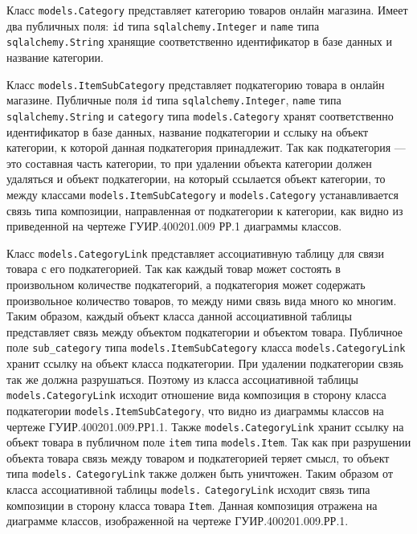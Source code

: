 Класс \texttt{models.Category} представляет категорию товаров онлайн магазина. Имеет два публичных поля: \texttt{id} типа \texttt{sqlalchemy.Integer} и \texttt{name} типа \texttt{sqlalchemy.String} хранящие соответственно идентификатор в базе данных и название категории.

Класс \texttt{models.ItemSubCategory} представляет подкатегорию товара в онлайн магазине. Публичные поля \texttt{id} типа \texttt{sqlalchemy.Integer}, \texttt{name} типа \texttt{sqlalchemy.String} и \texttt{category} типа \texttt{models.Category} хранят соответственно идентификатор в базе данных, название подкатегории и сслыку на объект категории, к которой данная подкатегория принадлежит. Так как подкатегория --- это составная часть категории, то при удалении объекта категории должен удаляться и объект подкатегории, на который ссылается объект категории, то между классами \texttt{models.ItemSubCategory} и \texttt{models.Category} устанавливается связь типа композиции, направленная от подкатегории к категории, как видно из приведенной на чертеже ГУИР.400201.009 РР.1 диаграммы классов.

Класс \texttt{models.CategoryLink} представляет ассоциативную таблицу для связи товара с его подкатегорией. Так как каждый товар может состоять в произвольном количестве подкатегорий, а подкатегория может содержать произвольное количество товаров, то между ними связь вида много ко многим. Таким образом, каждый объект класса данной ассоциативной таблицы представляет связь между объектом подкатегории и объектом товара. Публичное поле \texttt{sub\_category} типа \texttt{models.ItemSubCatego\-ry} класса \texttt{mo\-dels.CategoryLink} хранит ссылку на объект класса подкатегории. При удалении подкатегории свзяь так же должна разрушаться. Поэтому из класса ассоциативной таблицы \texttt{models.CategoryLink} исходит отношение вида композиция в сторону класса подкатегории \texttt{models.Item\-Sub\-Ca\-te\-go\-ry}, что видно из диаграммы классов на чертеже ГУИР.400201.009.РР1.1. Также \texttt{models.Cate\-goryLink} хранит ссылку на объект товара в публичном поле \texttt{item} типа \texttt{mo\-dels.Item}. Так как при разрушении объекта товара связь между товаром и подкатегорией теряет смысл, то объект типа \texttt{models.} \texttt{Ca\-te\-go\-ry\-Link} также должен быть уничтожен. Таким образом от класса ассоциативной таблицы \texttt{mo\-dels.} \texttt{CategoryLink} исходит связь типа композиции в сторону класса товара \texttt{Item}. Данная композиция отражена на диаграмме классов, изображенной на чертеже ГУИР.400201.009.РР.1.


